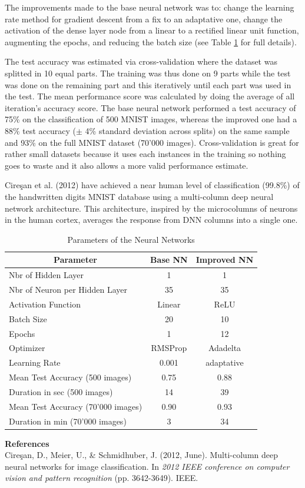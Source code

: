 \documentclass[paper=a4, fontsize=11pt]{scrartcl}
\numberwithin{equation}{section}		%
\numberwithin{figure}{section}			%
\numberwithin{table}{section}				%
\begin{document}
The improvements made to the base neural network was to: change the learning rate method for gradient descent from a fix to an adaptative one, change the activation of the dense layer node from a linear to a rectified linear unit function, augmenting the epochs, and reducing the batch size (see Table \ref{tab:NN} for full details).\par
The test accuracy was estimated via cross-validation where the dataset was splitted in 10 equal parts. The training was thus done on 9 parts while the test was done on the remaining part and this iteratively until each part was used in the test. The mean performance score was calculated by doing the average of all iteration's accuracy score. The base neural network performed a test accuracy of 75\% on the classification of 500 MNIST images, whereas the improved one had a 88\% test accuracy ($\pm$ 4\% standard deviation across splits) on the same sample and 93\% on the full MNIST dataset (70'000 images). Cross-validation is great for rather small datasets because it uses each instances in the training so nothing goes to waste and it also allows a more valid performance estimate.\par
Cire\c{s}an et al. (2012) have achieved a near human level of classification (99.8\%) of the handwritten digits MNIST database using a multi-column deep neural network architecture. This architecture, inspired by the microcolumns of neurons in the human cortex, averages the response from DNN columns into a single one.



\setlength{\tabcolsep}{20pt}
\begin{table}[!h]
\small
\caption{Parameters of the Neural Networks}
\begin{tabular}{lcc}
\toprule
\multicolumn{1}{c}{Parameter} &
\multicolumn{1}{c}{Base NN} &
\multicolumn{1}{c}{Improved NN}\\
\midrule
Nbr of Hidden Layer  & 1 & 1             \\
Nbr of Neuron per Hidden Layer  & 35 & 35  \\ Activation Function & Linear & ReLU       \\
Batch Size & 20 & 10                 \\
Epochs & 1 & 12                \\
Optimizer & RMSProp & Adadelta \\
Learning Rate & 0.001   & adaptative   \\
Mean Test Accuracy (500 images) &  0.75 & 0.88 \\
Duration in sec (500 images) & 14 & 39 \\
Mean Test Accuracy (70'000 images) & 0.90  &  0.93 \\
Duration in min (70'000 images) & 3 &   34 \\
\midrule
\end{tabular}
\label{tab:NN}
\end{table}

\textbf{References}\\
\small{Cire\c{s}an, D., Meier, U., & Schmidhuber, J. (2012, June). Multi-column deep neural networks for image classification. In \textit{2012 IEEE conference on computer vision and pattern recognition} (pp. 3642-3649). IEEE.}
\end{document}
